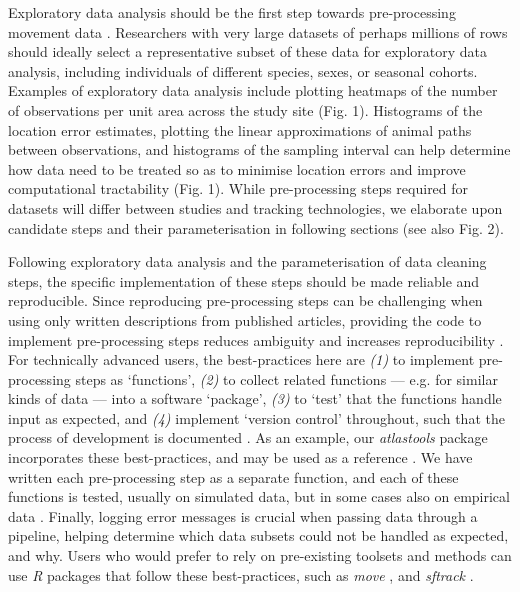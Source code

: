 \begin{refsection}
    Exploratory data analysis should be the first step towards pre-processing movement data \cite[see Fig. 1;][]{slingsby2016}.
    Researchers with very large datasets of perhaps millions of rows should ideally select a representative subset of these data for exploratory data analysis, including individuals of different species, sexes, or seasonal cohorts.
    Examples of exploratory data analysis include plotting heatmaps of the number of observations per unit area across the study site (Fig. 1).
    Histograms of the location error estimates, plotting the linear approximations of animal paths between observations, and histograms of the sampling interval can help determine how data need to be treated so as to minimise location errors and improve computational tractability (Fig. 1).
    While pre-processing steps required for datasets will differ between studies and tracking technologies, we elaborate upon candidate steps and their parameterisation in following sections (see also Fig. 2).

    Following exploratory data analysis and the parameterisation of data cleaning steps, the specific implementation of these steps should be made reliable and reproducible.
    Since reproducing pre-processing steps can be challenging when using only written descriptions from published articles, providing the code to implement pre-processing steps reduces ambiguity and increases reproducibility \cite{haddaway2015}.
    For technically advanced users, the best-practices here are \textit{(1)} to implement pre-processing steps as `functions', \textit{(2)} to collect related functions --- e.g. for similar kinds of data --- into a software `package', \textit{(3)} to `test' that the functions handle input as expected, and \textit{(4)} implement `version control' throughout, such that the process of development is documented \cite[Fig. 1;][]{wickham2015,alston2020,perez-riverol2016}.
    As an example, our \textit{atlastools} package incorporates these best-practices, and may be used as a reference \cite[][]{gupte2020a}.
    We have written each pre-processing step as a separate function, and each of these functions is tested, usually on simulated data, but in some cases also on empirical data \cite[][see the directory \textit{tests/} in the associated Zenodo repository]{wickham2015}.
    Finally, logging error messages is crucial when passing data through a pipeline, helping determine which data subsets could not be handled as expected, and why.
    Users who would prefer to rely on pre-existing toolsets and methods can use \textit{R} packages that follow these best-practices, such as \textit{move} \cite{kranstauber2011}, and \textit{sftrack} \cite{boone2020}.


\end{refsection}
